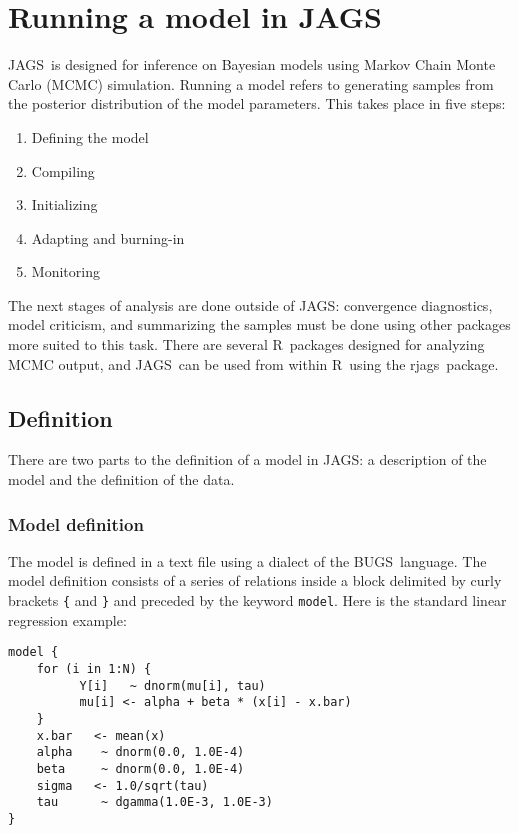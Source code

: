\documentclass[11pt, a4paper, titlepage]{report}
\newcommand{\JAGS}{\textsf{JAGS}}
\newcommand{\rjags}{\textsf{rjags}}
\newcommand{\BUGS}{\textsf{BUGS}}
\newcommand{\R}{\textsf{R}}
\begin{document}
\chapter{Running a model in \JAGS}

\JAGS\ is designed for inference on Bayesian models using Markov Chain
Monte Carlo (MCMC) simulation.  Running a model refers to generating
samples from the posterior distribution of the model parameters.  This
takes place in five steps:
\begin{enumerate}
\item Defining the model
\item Compiling
\item Initializing
\item Adapting and burning-in
\item Monitoring
\end{enumerate}
The next stages of analysis are done outside of \JAGS: convergence
diagnostics, model criticism, and summarizing the samples must be done
using other packages more suited to this task. There are several
\R\ packages designed for analyzing MCMC output, and \JAGS\ can be
used from within \R\ using the \rjags\ package.

\section{Definition}

There are two parts to the definition of a model in \JAGS: a
description of the model and the definition of the data.

\subsection{Model definition}

The model is defined in a text file using a dialect of the
\BUGS\ language.  The model definition consists of a series of
relations inside a block delimited by curly brackets \verb+{+ and
\verb+}+ and preceded by the keyword \verb+model+. Here is the standard
linear regression example:

\begin{verbatim}
model {
    for (i in 1:N) {
          Y[i]   ~ dnorm(mu[i], tau)
          mu[i] <- alpha + beta * (x[i] - x.bar)
    }
    x.bar   <- mean(x)
    alpha    ~ dnorm(0.0, 1.0E-4)
    beta     ~ dnorm(0.0, 1.0E-4)
    sigma   <- 1.0/sqrt(tau)
    tau      ~ dgamma(1.0E-3, 1.0E-3)
}
\end{verbatim}
\end{document}
